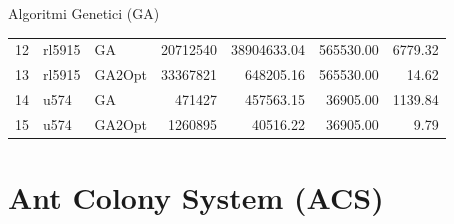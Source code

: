 \documentclass{beamer}
\begin{document}
\begin{frame}{Algoritmi Genetici (GA)}
\begin{table}[H]
\begin{tabular}{lllrrrr}
            12 & rl5915   & GA        & 20712540   & 38904633.04    & 565530.00        & 6779.32 \\
            13 & rl5915   & GA2Opt    & 33367821   & 648205.16      & 565530.00        & 14.62   \\
            14 & u574     & GA        & 471427     & 457563.15      & 36905.00         & 1139.84 \\
            15 & u574     & GA2Opt    & 1260895    & 40516.22       & 36905.00         & 9.79    \\
            \bottomrule
        \end{tabular}
    \end{table}
\end{frame}

\section{Ant Colony System (ACS)}
\end{document}
